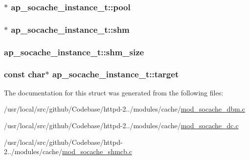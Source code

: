 \subsubsection[{\texorpdfstring{pool}{pool}}]{$\ast$ ap\+\_\+socache\+\_\+instance\+\_\+t\+::pool}\hypertarget{structap__socache__instance__t_af814a2dffa2e0dceaa9447d012d93540}{}\label{structap__socache__instance__t_af814a2dffa2e0dceaa9447d012d93540}
\subsubsection[{\texorpdfstring{shm}{shm}}]{$\ast$ ap\+\_\+socache\+\_\+instance\+\_\+t\+::shm}\hypertarget{structap__socache__instance__t_af61eb0fa997bf4c0c6734294d3cd1fd6}{}\label{structap__socache__instance__t_af61eb0fa997bf4c0c6734294d3cd1fd6}
\subsubsection[{\texorpdfstring{shm\+\_\+size}{shm_size}}]{ ap\+\_\+socache\+\_\+instance\+\_\+t\+::shm\+\_\+size}\hypertarget{structap__socache__instance__t_a950846af69da26bb04e9ee685f49fdbc}{}\label{structap__socache__instance__t_a950846af69da26bb04e9ee685f49fdbc}
\subsubsection[{\texorpdfstring{target}{target}}]{\setlength{\rightskip}{0pt plus 5cm}const char$\ast$ ap\+\_\+socache\+\_\+instance\+\_\+t\+::target}\hypertarget{structap__socache__instance__t_ae073e4460e075701ae25682192536544}{}\label{structap__socache__instance__t_ae073e4460e075701ae25682192536544}


The documentation for this struct was generated from the following files\+:\begin{DoxyCompactItemize}
\item 
/usr/local/src/github/\+Codebase/httpd-\/2../modules/cache/\hyperlink{mod__socache__dbm_8c}{mod\+\_\+socache\+\_\+dbm.\+c}\item 
/usr/local/src/github/\+Codebase/httpd-\/2../modules/cache/\hyperlink{mod__socache__dc_8c}{mod\+\_\+socache\+\_\+dc.\+c}\item 
/usr/local/src/github/\+Codebase/httpd-\/2../modules/cache/\hyperlink{mod__socache__shmcb_8c}{mod\+\_\+socache\+\_\+shmcb.\+c}\end{DoxyCompactItemize}
